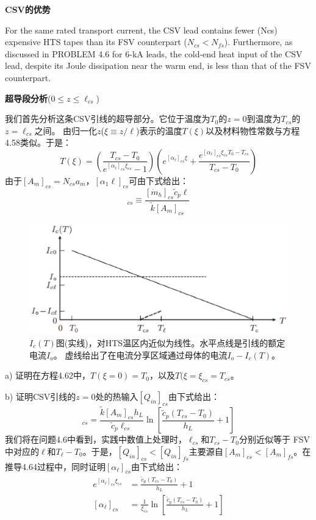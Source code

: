 \textbf{CSV的优势}

For the same rated transport current, the CSV lead contains fewer (Ncs) expensive
HTS tapes than its FSV counterpart ($N_{cs} <N_{fs}$). Furthermore, as discussed in
PROBLEM 4.6 for 6-kA leads, the cold-end heat input of the CSV lead, despite
its Joule dissipation near the warm end, is less than that of the FSV counterpart.

\textbf{超导段分析}($0\le z\le \ell_{cs}$)

我们首先分析这条CSV引线的超导部分。它位于温度为$T_0$的$z = 0$到温度为$T_{cs}$的$z =\ell_{cs}$之间。
由归一化$z$($\xi\equiv z/\ell$)表示的温度$T(\xi)$以及材料物性常数与方程4.58类似。于是：
\begin{equation}%
T(\xi)=(\frac{T_{cs}-T_0}{e^{[\alpha_\ell]_{cs}\xi_{cs}}-1})(e^{[\alpha_\ell]_{cs}\xi}+\frac{e^{[\alpha_\ell]_{cs}\xi_{cs}T_0-T_{cs}}}{T_{cs}-T_0})
\end{equation}
由于$[A_m]_{cs}=N_{cs}a_m$，$[\alpha_{1}\ell]_{cs}$可由下式给出：
\begin{equation}%
[\alpha_\ell]_{cs}\equiv\frac{[\dot{m}_h]_{cs}\tilde{c}_p\ell}{\tilde{k}[A_m]_{cs}}
\end{equation}

\begin{figure}[htbp]
	\centering
	\includegraphics[scale=0.7]{chpt4/figs/fig4.22.eps}
	\caption{$I_c(T)$图(实线)，对HTS温区内近似为线性。水平点线是引线的额定电流$I_o$。
		虚线给出了在电流分享区域通过母体的电流$I_o-I_c(T)$。}
\end{figure}

a) 证明在方程4.62中，$T(\xi=0)=T_0$，以及$T(\xi=\xi_{cs}=T_{cs}$。
	
b) 证明CSV引线的$z=0$处的热输入$[Q_{in}]_{cs}$由下式给出：
\begin{equation}%
[Q_{in}]_{cs}=\frac{\tilde{k}[A_m]_{cs}h_L}{\tilde{c}_p\ell_{cs}}\ln\left[\frac{\tilde{c}_p(T_{cs}-T_0)}{h_L}+1\right]
\end{equation}
我们将在问题4.6中看到，实践中数值上处理时，$\ell_{cs}$和$T_{cs}−T_0$分别近似等于
FSV中对应的$\ell$和$T_\ell−T_0$。于是，$[Q_{in}]_{cs}<[Q_{in}]_{fs}$主要源自$[A_m]_{cs} < [A_m]_{fs}$。在推导4.64过程中，同时证明$[\alpha_\ell]_{cs}$由下式给出：
\begin{subequations}
	\begin{align*}
e^{[\alpha_\ell]_{cs}\xi_{cs}}&=\frac{\tilde{c}_p(T_{cs}-T_0)}{h_L}+1\\
[\alpha_\ell]_{cs}&=\frac{1}{\xi_{cs}}\ln\left[\frac{\tilde{c}_p(T_{cs}-T_0)}{h_L}+1\right]
	\end{align*}
\end{subequations}

